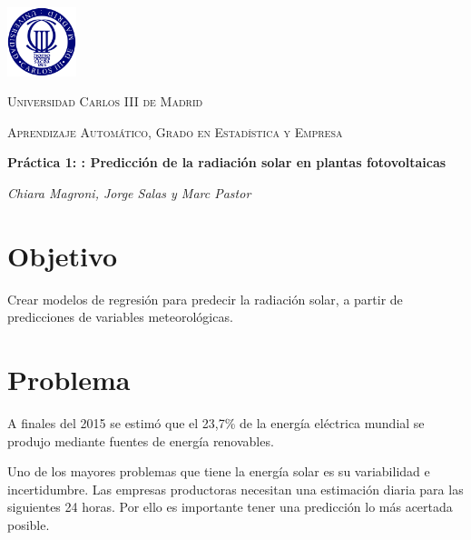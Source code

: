 \documentclass[
  11pt,
  a4paper,
]{article}
\author{}
\date{\vspace{-2.5em}}
\begin{document}

\graphicspath{ {images/} }

\begin{center}
\centering
	\includegraphics[width=0.15\textwidth]{uc3m}\par\vspace{1cm}
{\scshape\LARGE Universidad Carlos III de Madrid \par}
	\vspace{1cm}
	{\scshape\Large Aprendizaje Automático, Grado en Estadística y Empresa \par}
	\vspace{1.5cm}
	{\huge\bfseries Práctica 1: : Predicción de la radiación solar en plantas
fotovoltaicas\par}
	\vspace{2cm}
	{\Large\itshape Chiara Magroni, Jorge Salas y Marc Pastor \par}
	\date{25 de noviembre de 2022}
	\vfill
	\vfill
\end{center}

\newpage

{
\hypersetup{linkcolor=}
\setcounter{tocdepth}{6}
\tableofcontents
}
\newpage
\section{Objetivo}

Crear modelos de regresión para predecir la radiación solar, a partir de
predicciones de variables meteorológicas.

\section{Problema}

A finales del 2015 se estimó que el 23,7\% de la energía eléctrica
mundial se produjo mediante fuentes de energía renovables.

Uno de los mayores problemas que tiene la energía solar es su
variabilidad e incertidumbre. Las empresas productoras necesitan una
estimación diaria para las siguientes 24 horas. Por ello es importante
tener una predicción lo más acertada posible.
\end{document}
